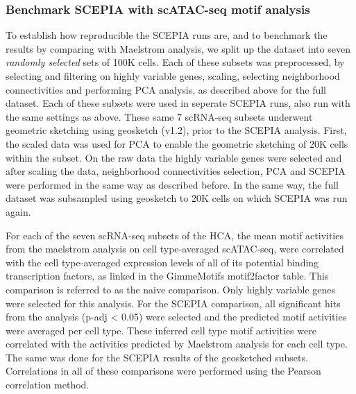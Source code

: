 \subsubsection{Benchmark SCEPIA with scATAC-seq motif analysis}

To establish how reproducible the SCEPIA runs are, and to benchmark the results by comparing with Maelstrom analysis, we split up the dataset into seven \textit{randomly selected} sets of 100K cells. Each of these subsets was preprocessed, by selecting and filtering on highly variable genes, scaling, selecting neighborhood connectivities and performing PCA analysis, as described above for the full dataset. Each of these subsets were used in seperate SCEPIA runs, also run with the same settings as above. These same 7 scRNA-seq subsets underwent geometric sketching using geosketch (v1.2), prior to the SCEPIA analysis. First, the scaled data was used for PCA to enable the geometric sketching of 20K cells within the subset. On the raw data the highly variable genes were selected and after scaling the data, neighborhood connectivities selection, PCA and SCEPIA were performed in the same way as described before. In the same way, the full dataset was subsampled using geosketch to 20K cells on which SCEPIA was run again.

For each of the seven scRNA-seq subsets of the HCA, the mean motif activities from the maelstrom analysis on cell type-averaged scATAC-seq, were correlated with the cell type-averaged expression levels of all of its potential binding transcription factors, as linked in the GimmeMotifs motif2factor table. This comparison is referred to as the naive comparison. Only highly variable genes were selected for this analysis. For the SCEPIA comparison, all significant hits from the analysis (p-adj < 0.05) were selected and the predicted motif activities were averaged per cell type. These inferred cell type motif activities were correlated with the activities predicted by Maelstrom analysis for each cell type. The same was done for the SCEPIA results of the geosketched subsets. Correlations in all of these comparisons were performed using the Pearson correlation method.

